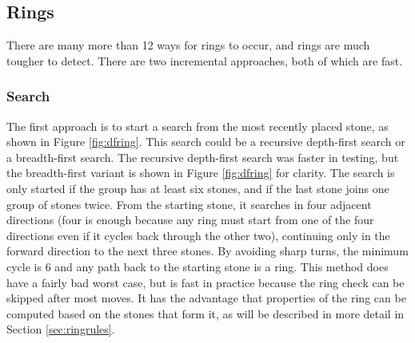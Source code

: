 \subsection{Rings}\label{sec:ringimpl}

There are many more than 12 ways for rings to occur, and rings are much tougher to detect. There are two incremental approaches, both of which are fast.

\subsubsection{Search}

The first approach is to start a search from the most recently placed stone, as shown in Figure \ref{fig:dfring}. This search could be a recursive depth-first search or a breadth-first search. The recursive depth-first search was faster in testing, but the breadth-first variant is shown in Figure \ref{fig:dfring} for clarity. The search is only started if the group has at least six stones, and if the last stone joins one group of stones twice. From the starting stone, it searches in four adjacent directions (four is enough because any ring must start from one of the four directions even if it cycles back through the other two), continuing only in the forward direction to the next three stones. By avoiding sharp turns, the minimum cycle is 6 and any path back to the starting stone is a ring. This method does have a fairly bad worst case, but is fast in practice because the ring check can be skipped after most moves. It has the advantage that properties of the ring can be computed based on the stones that form it, as will be described in more detail in Section \ref{sec:ringrules}.

